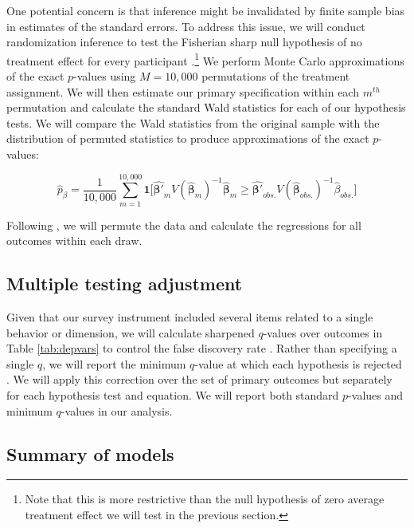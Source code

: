 \documentclass[11pt, a4paper]{article}\usepackage[]{graphicx}\usepackage[]{color}
\begin{document}
        One potential concern is that inference might be invalidated by finite sample bias in estimates of the standard errors. To address this issue, we will conduct randomization inference to test the Fisherian sharp null hypothesis of no treatment effect for every participant \parencite{fisher_design_1935}.\footnote{Note that this is more restrictive than the null hypothesis of zero average treatment effect we will test in the previous section.} We perform Monte Carlo approximations of the exact $p$-values using $M=10,000$ permutations of the treatment assignment. We will then estimate our primary specification within each $m^{th}$ permutation and calculate the standard Wald statistics for each of our hypothesis tests. We will compare the Wald statistics from the original sample with the distribution of permuted statistics to produce approximations of the exact $p$-values:

        \begin{equation} \label{eq:exactp}
            \hat{p}_{\beta} =  \frac{1}{10,000}\sum_{m=1}^{10,000} \mathbf{1} \Big [ \mathbf{\hat{\beta'}}_m V(\mathbf{\hat{\beta}}_m)^{-1} \mathbf{\hat{\beta}}_m \geq \mathbf{\hat{\beta'}}_{obs.} V(\mathbf{\hat{\beta}}_{obs.})^{-1} \hat{\beta}_{obs.} \Big ]
        \end{equation}

        Following \textcite{young_channeling_2015}, we will permute the data and calculate the regressions for all outcomes within each draw.

    \subsection{Multiple testing adjustment}

        Given that our survey instrument included several items related to a single behavior or dimension, we will calculate sharpened $q$-values over outcomes in Table \ref{tab:depvars} to control the false discovery rate \parencite{benjamini_adaptive_2006}. Rather than specifying a single $q$, we will report the minimum $q$-value at which each hypothesis is rejected \parencite{anderson_multiple_2008}. We will apply this correction over the set of primary outcomes but separately for each hypothesis test and equation. We will report both standard $p$-values and minimum $q$-values in our analysis.

    \subsection{Summary of models}
\end{document}
